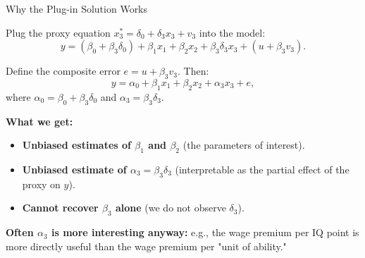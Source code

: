 \documentclass[aspectratio=169, 12pt]{beamer}
\begin{document}
\begin{frame}[shrink=10]{Why the Plug-in Solution Works}

  Plug the proxy equation $x_3^* = \delta_0 + \delta_3 x_3 + v_3$ into the model:
  \[
    y = (\beta_0 + \beta_3 \delta_0) + \beta_1 x_1 + \beta_2 x_2
    + \beta_3 \delta_3 x_3 + (u + \beta_3 v_3).
  \]

  Define the composite error $e = u + \beta_3 v_3$. Then:
  \[
    y = \alpha_0 + \beta_1 x_1 + \beta_2 x_2 + \alpha_3 x_3 + e,
  \]
  where $\alpha_0 = \beta_0 + \beta_3 \delta_0$ and $\alpha_3 = \beta_3 \delta_3$.

  \begin{highlightbox}
    \textbf{What we get:}
    \begin{itemize}\setlength{\itemsep}{1pt}
      \item \textbf{Unbiased estimates of $\beta_1$ and $\beta_2$} (the parameters of interest).
      \item \textbf{Unbiased estimate of $\alpha_3 = \beta_3 \delta_3$} (interpretable as the partial effect of the proxy on $y$).
      \item \textbf{Cannot recover $\beta_3$ alone} (we do not observe $\delta_3$).
    \end{itemize}
  \end{highlightbox}

  \textbf{Often $\alpha_3$ is more interesting anyway:} e.g., the wage premium per IQ point
  is more directly useful than the wage premium per "unit of ability."

\end{frame}
\end{document}
